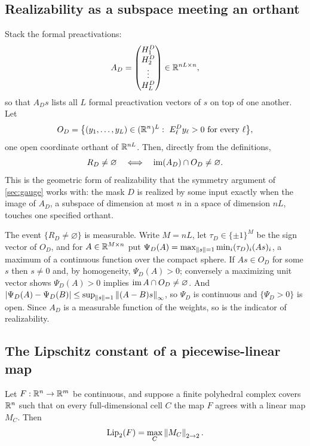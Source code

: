 \subsection{Realizability as a subspace meeting an orthant}

Stack the formal preactivations:
\begin{equation}\label{eq:AD}
A_D=\begin{pmatrix}H^D_1\\ H^D_2\\ \vdots\\ H^D_L\end{pmatrix}\in\mathbb{R}^{nL\times n},
\end{equation}
so that $A_Ds$ lists all $L$ formal preactivation vectors of $s$ on top of one another. Let
\[
O_D=\bigl\{(y_1,\dots,y_L)\in(\mathbb{R}^n)^L:\ E^D_\ell y_\ell>0\ \text{for every }\ell\bigr\},
\]
one open coordinate orthant of $\mathbb{R}^{nL}$. Then, directly from the definitions,
\begin{equation}\label{eq:realize}
R_D\ne\varnothing\quad\Longleftrightarrow\quad\operatorname{im}(A_D)\cap O_D\ne\varnothing .
\end{equation}
This is the geometric form of realizability that the symmetry argument of \cref{sec:gauge} works with: the mask $D$ is realized by some input exactly when the image of $A_D$, a subspace of dimension at most $n$ in a space of dimension $nL$, touches one specified orthant.

The event $\{R_D\ne\varnothing\}$ is measurable. Write $M=nL$, let $\tau_D\in\{\pm1\}^M$ be the sign vector of $O_D$, and for $A\in\mathbb{R}^{M\times n}$ put $\Psi_D(A)=\max_{\left\lVert s\right\rVert=1}\min_i(\tau_D)_i(As)_i$, a maximum of a continuous function over the compact sphere. If $As\in O_D$ for some $s$ then $s\ne0$ and, by homogeneity, $\Psi_D(A)>0$; conversely a maximizing unit vector shows $\Psi_D(A)>0$ implies $\operatorname{im} A\cap O_D\ne\varnothing$. And $\left\lvert \Psi_D(A)-\Psi_D(B)\right\rvert\le\sup_{\left\lVert s\right\rVert=1}\left\lVert (A-B)s\right\rVert_\infty$, so $\Psi_D$ is continuous and $\{\Psi_D>0\}$ is open. Since $A_D$ is a measurable function of the weights, so is the indicator of realizability.

\subsection{The Lipschitz constant of a piecewise-linear map}

\begin{lemma}\label{lem:pl}
Let $F:\mathbb{R}^n\to\mathbb{R}^m$ be continuous, and suppose a finite polyhedral complex covers $\mathbb{R}^n$ such that on every full-dimensional cell $C$ the map $F$ agrees with a linear map $M_C$. Then
\[
\operatorname{Lip}_2(F)=\max_C\left\lVert M_C\right\rVert_{2\to 2}.
\]
\end{lemma}


